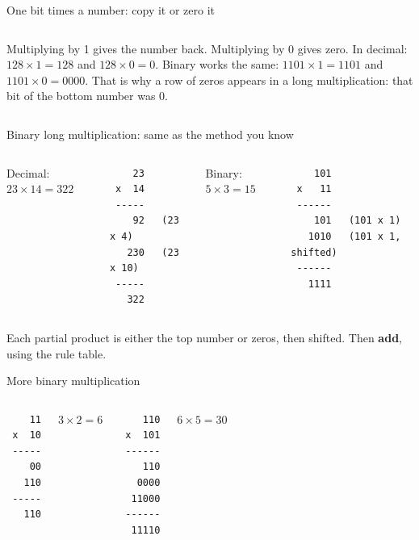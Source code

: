 \documentclass[aspectratio=169,10pt]{beamer}
\begin{document}
\begin{frame}{One bit times a number: copy it or zero it}
\begin{columns}[c]
Multiplying by 1 gives the number back. Multiplying by 0 gives zero. In decimal: $128\times1=128$ and $128\times0=0$.
Binary works the same: $1101\times1=1101$ and $1101\times0=0000$. That is why a row of zeros appears in a long multiplication: that bit of the bottom number was 0.
\end{columns}
\end{frame}

\begin{frame}[fragile]{Binary long multiplication: same as the method you know}
\begin{columns}
Decimal: $23\times 14=322$
\begin{verbatim}
    23
 x  14
 -----
    92   (23 x 4)
   230   (23 x 10)
 -----
   322
\end{verbatim}
Binary: $5\times 3=15$
\begin{verbatim}
    101
 x   11
 ------
    101   (101 x 1)
   1010   (101 x 1, shifted)
 ------
   1111
\end{verbatim}
\end{columns}
\vspace{4pt}
Each partial product is either the top number or zeros, then shifted. Then \textbf{add}, using the rule table.
\end{frame}

\begin{frame}[fragile]{More binary multiplication}
\begin{columns}
\begin{verbatim}
    11
 x  10
 -----
    00
   110
 -----
   110
\end{verbatim}
$3\times2=6$
\begin{verbatim}
    110
 x  101
 ------
    110
   0000
  11000
 ------
  11110
\end{verbatim}
$6\times5=30$
\end{columns}
\end{frame}
\end{document}
